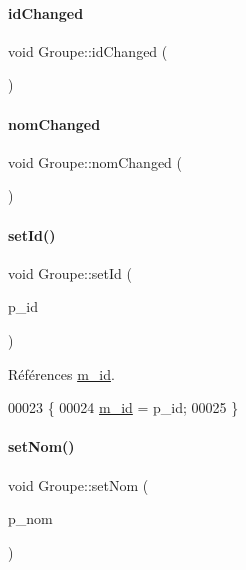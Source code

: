 \paragraph{\texorpdfstring{id\+Changed}{idChanged}}
{\footnotesize\ttfamily void Groupe\+::id\+Changed (\begin{DoxyParamCaption}{ }\end{DoxyParamCaption})\hspace{0.3cm}{\ttfamily [signal]}}

\mbox{\label{class_groupe_aa4c95ee9ca6f073e7b9e75dbd0e41b61}} 
\paragraph{\texorpdfstring{nom\+Changed}{nomChanged}}
{\footnotesize\ttfamily void Groupe\+::nom\+Changed (\begin{DoxyParamCaption}{ }\end{DoxyParamCaption})\hspace{0.3cm}{\ttfamily [signal]}}

\mbox{\label{class_groupe_a3cb79da346bcd56dee1c8305050fde60}} 
\paragraph{\texorpdfstring{set\+Id()}{setId()}}
{\footnotesize\ttfamily void Groupe\+::set\+Id (\begin{DoxyParamCaption}\item[{Q\+String}]{p\+\_\+id }\end{DoxyParamCaption})}



Références \hyperlink{class_groupe_ae837f3752cea27d8ab7678d4d1e4a764}{m\+\_\+id}.


\begin{DoxyCode}
00023 \{
00024     \hyperlink{class_groupe_ae837f3752cea27d8ab7678d4d1e4a764}{m\_id} = p\_id;
00025 \}
\end{DoxyCode}
\mbox{\label{class_groupe_a44566810eab44cd98be317f4d803a45e}} 
\paragraph{\texorpdfstring{set\+Nom()}{setNom()}}
{\footnotesize\ttfamily void Groupe\+::set\+Nom (\begin{DoxyParamCaption}\item[{Q\+String}]{p\+\_\+nom }\end{DoxyParamCaption})}



